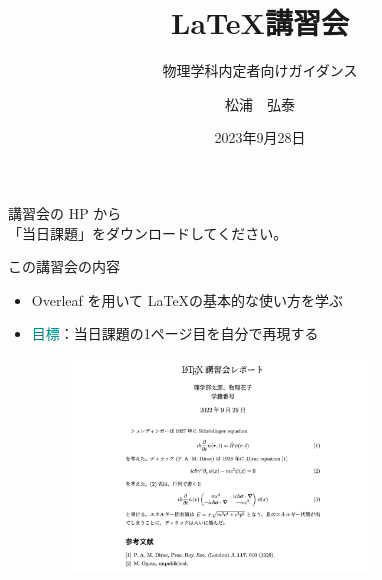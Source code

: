 \documentclass[dvipdfmx]{beamer}
\title{\LaTeX 講習会}
\author{松浦　弘泰}
\date{2023年9月28日}
\subtitle{物理学科内定者向けガイダンス}
\begin{document}
\begin{frame}
\titlepage
\centering
\footnotesize{講習会の HP から\\「当日課題」をダウンロードしてください。}

\end{frame}

\begin{frame}{この講習会の内容}
\begin{itemize}
    \item Overleaf を用いて \LaTeX の基本的な使い方を学ぶ
    
    \bigskip
    \item \textcolor{teal}{目標}：当日課題の1ページ目を自分で再現する
    \begin{figure}
        \centering
        \includegraphics[width=8cm]{./figures/fig_kadai.pdf}
    \end{figure}
\end{itemize}
\end{frame}
\end{document}
